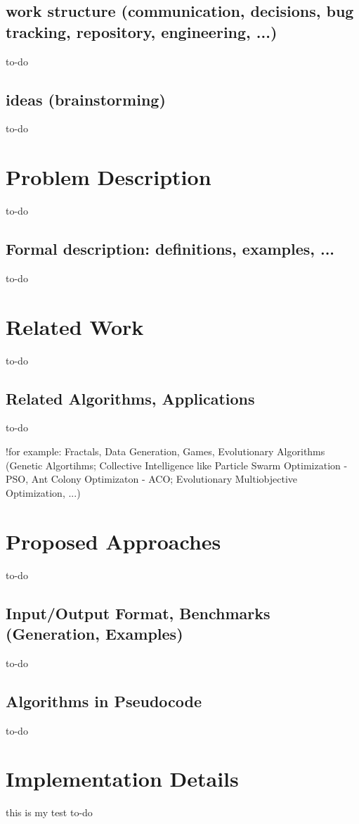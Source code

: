 \documentclass[a4paper,12pt]{article}
\begin{document}
\subsection{work structure (communication, decisions, bug tracking, repository, engineering, ...)}
to-do

\subsection{ideas (brainstorming)}
to-do

\section{Problem Description}
to-do
\subsection{Formal description: definitions, examples, ...}
to-do

\section{Related Work}
to-do
\subsection{Related Algorithms, Applications}
to-do

!for example: Fractals, Data Generation, Games, Evolutionary Algorithms (Genetic Algortihms; Collective Intelligence like Particle Swarm Optimization - PSO, Ant Colony Optimizaton - ACO; Evolutionary Multiobjective Optimization, ...)

\section{Proposed Approaches}
to-do
\subsection{Input/Output Format, Benchmarks (Generation, Examples)}
to-do
\subsection{Algorithms in Pseudocode}
to-do

\section{Implementation Details}
 this is my test
to-do
\end{document}
